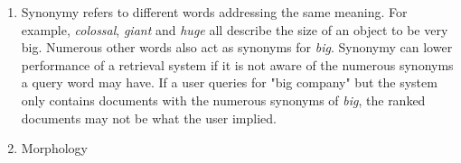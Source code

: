 \documentclass[11pt]{article}
\begin{document}
\begin{enumerate}
\begin{enumerate}
          \item Synonymy refers to different words addressing the same meaning. For example, \textit{colossal}, \textit{giant} and \textit{huge} all describe the size of an object to be very big. Numerous other words also act as synonyms for \textit{big}.
                Synonymy can lower performance of a retrieval system if it is not aware of the numerous synonyms a query word may have. If a user queries for "big company" but the system only contains documents with the numerous synonyms of \textit{big}, the ranked documents may not be what the user implied.

          \item Morphology
        \end{enumerate}

\end{enumerate}
\end{document}
